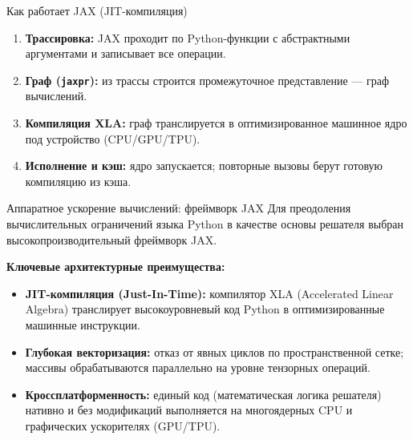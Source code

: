 \documentclass[ignoreonframetext,unicode,aspectratio=169]{beamer}
\begin{document}
\begin{frame}
	\begin{block}{Как работает JAX (JIT-компиляция)}
		\small
		\begin{enumerate}\itemsep2pt
			\item \textbf{Трассировка:} JAX проходит по Python-функции с абстрактными аргументами и записывает все операции.
			\item \textbf{Граф (\texttt{jaxpr}):} из трассы строится промежуточное представление --- граф вычислений.
			\item \textbf{Компиляция XLA:} граф транслируется в оптимизированное машинное ядро под устройство (CPU/GPU/TPU).
			\item \textbf{Исполнение и кэш:} ядро запускается; повторные вызовы берут готовую компиляцию из кэша.
		\end{enumerate}
	\end{block}
\end{frame}

	\begin{frame}{Аппаратное ускорение вычислений: фреймворк JAX}
		Для преодоления вычислительных ограничений языка Python в качестве основы решателя выбран высокопроизводительный фреймворк JAX.

		\vspace{0.3cm}
		\textbf{Ключевые архитектурные преимущества:}
		\begin{itemize}
			\item \textbf{JIT-компиляция (Just-In-Time):} компилятор XLA (Accelerated Linear Algebra) транслирует высокоуровневый код Python в оптимизированные машинные инструкции.
			\item \textbf{Глубокая векторизация:} отказ от явных циклов по пространственной сетке; массивы обрабатываются параллельно на уровне тензорных операций.
			\item \textbf{Кроссплатформенность:} единый код (математическая логика решателя) нативно и без модификаций выполняется на многоядерных CPU и графических ускорителях (GPU/TPU).
		\end{itemize}
	\end{frame}
\end{document}
